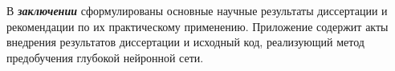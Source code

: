 \documentclass{thesisby}
\begin{document}
  
	
В \textbf{\textit{заключении}} сформулированы основные научные результаты диссертации и рекомендации по их практическому применению.
Приложение содержит акты внедрения результатов диссертации и исходный код, реализующий метод предобучения глубокой нейронной сети.



\end{document}
